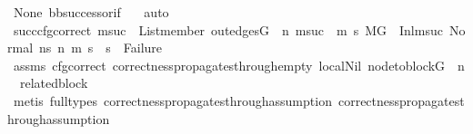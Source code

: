\begin{isabellebody}
\ None\ bb{\isacharunderscore}{\kern0pt}successor{\isacharunderscore}{\kern0pt}if\ {}\ \isamarkupfalse%
\ auto\isanewline
\isanewline
\ \ \ \ \ \ \ \ \ \ \isamarkupfalse%
\ succ{\isacharunderscore}{\kern0pt}cfg{\isacharunderscore}{\kern0pt}correct{\isacharcolon}{\kern0pt}\ {\isachardoublequoteopen}{\isacharparenleft}{\kern0pt}{\isasymforall}msuc{}{\isachardot}{\kern0pt}\ \ List{\isachardot}{\kern0pt}member\ {\isacharparenleft}{\kern0pt}out{\isacharunderscore}{\kern0pt}edges{\isacharparenleft}{\kern0pt}G{\isacharparenright}{\kern0pt}\ {\isacharbang}{\kern0pt}\ n{\isacharparenright}{\kern0pt}\ msuc{}\ {\isasymlongrightarrow}\ {\isacharparenleft}{\kern0pt}{\isasymforall}m{}\ s{}{\isachardot}{\kern0pt}\ {\isacharparenleft}{\kern0pt}{\isacharparenleft}{\kern0pt}M{\isacharcomma}{\kern0pt}{\isasymLambda}{\isacharcomma}{\kern0pt}{\isasymGamma}{\isacharcomma}{\kern0pt}{\isasymOmega}{\isacharcomma}{\kern0pt}G\ {\isasymturnstile}\ {\isacharparenleft}{\kern0pt}Inl{\isacharparenleft}{\kern0pt}msuc{}{\isacharparenright}{\kern0pt}{\isacharcomma}{\kern0pt}\ {\isacharparenleft}{\kern0pt}Normal\ ns{}{\isacharparenright}{\kern0pt}{\isacharparenright}{\kern0pt}\ {\isacharminus}{\kern0pt}n{\isasymrightarrow}{\isacharasterisk}{\kern0pt}\ {\isacharparenleft}{\kern0pt}m{}{\isacharcomma}{\kern0pt}\ s{}{\isacharparenright}{\kern0pt}{\isacharparenright}{\kern0pt}\ {\isasymlongrightarrow}\ s{}\ {\isasymnoteq}\ Failure{\isacharparenright}{\kern0pt}{\isacharparenright}{\kern0pt}{\isacharparenright}{\kern0pt}{\isachardoublequoteclose}\isanewline
\ \ \ \ \ \ \ \ \ \ \ \ \isamarkupfalse%
\ assms{\isacharparenleft}{\kern0pt}{}{\isacharparenright}{\kern0pt}\ cfg{\isacharunderscore}{\kern0pt}correct\ correctness{\isacharunderscore}{\kern0pt}propagates{\isacharunderscore}{\kern0pt}through{\isacharunderscore}{\kern0pt}empty\ local{\isachardot}{\kern0pt}Nil\ {\isacartoucheopen}node{\isacharunderscore}{\kern0pt}to{\isacharunderscore}{\kern0pt}block{\isacharparenleft}{\kern0pt}G{\isacharparenright}{\kern0pt}\ {\isacharbang}{\kern0pt}\ n\ {\isacharequal}{\kern0pt}\ related{\isacharunderscore}{\kern0pt}block{\isacartoucheclose}\isanewline
\ \ \ \ \ \ \ \ \ \ \ \ \isamarkupfalse%
\ {\isacharparenleft}{\kern0pt}metis\ {\isacharparenleft}{\kern0pt}full{\isacharunderscore}{\kern0pt}types{\isacharparenright}{\kern0pt}\ correctness{\isacharunderscore}{\kern0pt}propagates{\isacharunderscore}{\kern0pt}through{\isacharunderscore}{\kern0pt}assumption\ correctness{\isacharunderscore}{\kern0pt}propagates{\isacharunderscore}{\kern0pt}through{\isacharunderscore}{\kern0pt}assumption{}{\isacharparenright}{\kern0pt}\isanewline

\end{isabellebody}
